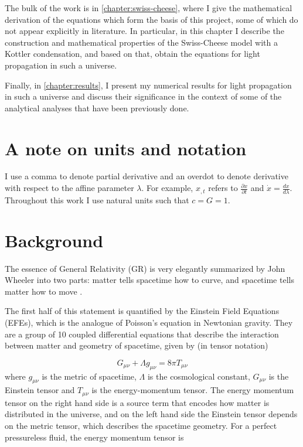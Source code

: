 The bulk of the work is in \autoref{chapter:swiss-cheese}, where I give the mathematical derivation of the equations which form the basis of this project, some of which do not appear explicitly in literature. In particular, in this chapter I describe the construction and mathematical properties of the Swiss-Cheese model with a Kottler condensation, and based on that, obtain the equations for light propagation in such a universe. 

Finally, in \autoref{chapter:results}, I present my numerical results for light propagation in such a universe and discuss their significance in the context of some of the analytical analyses that have been previously done. 

\section{A note on units and notation}
I use a comma to denote partial derivative and an overdot to denote derivative with respect to the affine parameter $\lambda$. For example, $x_{,t}$ refers to $\frac{\partial x}{\partial t}$ and $\dot{x} = \frac{dx}{d\lambda}$. Throughout this work I use natural units such that $c = G = 1$. 

\section{Background}

The essence of General Relativity (GR) is very elegantly summarized by John Wheeler into two parts: matter tells spacetime how to curve, and spacetime tells matter how to move \citep[pg.235]{wheeler2000geons}. 

The first half of this statement is quantified by the Einstein Field Equations (EFEs), which is the analogue of Poisson's equation in Newtonian gravity. They are a group of 10 coupled differential equations that describe the interaction between matter and geometry of spacetime, given by (in tensor notation)

\begin{equation}
  G_{\mu \nu} + \Lambda g_{\mu \nu} = 8\pi T_{\mu \nu}
  \label{eq:efes}
\end{equation}
where $g_{\mu \nu}$ is the metric of spacetime, $\Lambda$ is the cosmological constant, $G_{\mu \nu}$ is the Einstein tensor and $T_{\mu \nu}$ is the energy-momentum tensor. The energy momentum tensor on the right hand side is a source term that encodes how matter is distributed in the universe, and on the left hand side the Einstein tensor depends on the metric tensor, which describes the spacetime geometry. For a perfect pressureless fluid, the energy momentum tensor is

